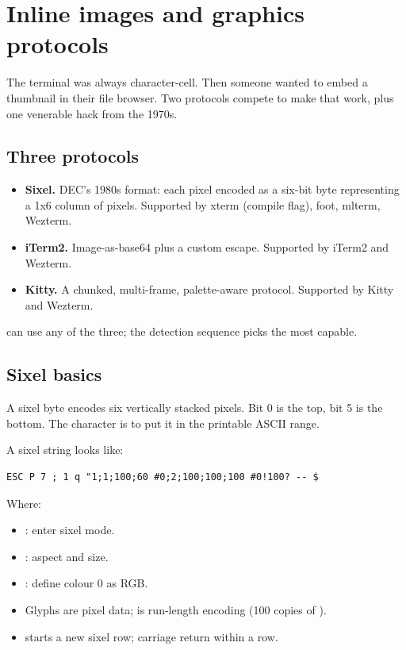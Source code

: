 \chapter{Inline images and graphics protocols}
\label{ch:images}

\begin{aside}
The terminal was always character-cell. Then someone wanted to
embed a thumbnail in their file browser. Two protocols compete
to make that work, plus one venerable hack from the 1970s.
\end{aside}

\section{Three protocols}

\begin{itemize}[leftmargin=*]
  \item \textbf{Sixel.} DEC's 1980s format: each pixel encoded
    as a six-bit byte representing a 1x6 column of pixels.
    Supported by xterm (compile flag), foot, mlterm, Wezterm.
  \item \textbf{iTerm2.} Image-as-base64 plus a custom escape.
    Supported by iTerm2 and Wezterm.
  \item \textbf{Kitty.} A chunked, multi-frame, palette-aware
    protocol. Supported by Kitty and Wezterm.
\end{itemize}

\maya{} can use any of the three; the detection sequence picks
the most capable.

\section{Sixel basics}

A sixel byte encodes six vertically stacked pixels. Bit 0 is
the top, bit 5 is the bottom. The character is 
to put it in the printable ASCII range.

A sixel string looks like:

\begin{lstlisting}
ESC P 7 ; 1 q "1;1;100;60 #0;2;100;100;100 #0!100? -- $
\end{lstlisting}

Where:
\begin{itemize}[leftmargin=*]
  \item {}: enter sixel mode.
  \item {}: aspect and size.
  \item {}: define colour 0 as RGB.
  \item Glyphs are pixel data;  is run-length
    encoding (100 copies of ).
  \item \code{-} starts a new sixel row; \code{\$} carriage
    return within a row.
\end{itemize}

